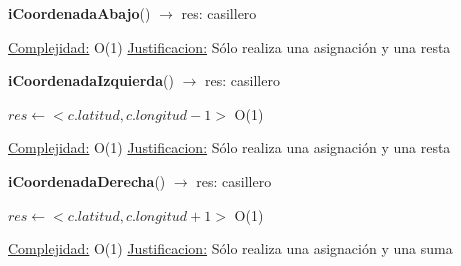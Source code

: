 \begin{Algoritmos}
\begin{algorithm}[H]{\textbf{iCoordenadaAbajo}() $\to$ res: casillero}
\begin{algorithmic}[1]
		\medskip
		\Statex \underline{Complejidad:} O(1)
			\Statex \underline{Justificacion:} Sólo realiza una asignación y una resta
	\end{algorithmic}
\end{algorithm}

\begin{algorithm}[H]{\textbf{iCoordenadaIzquierda}() $\to$ res: casillero}
	\begin{algorithmic}[1]
		\State $res \gets <c.latitud, c.longitud - 1>$ \Comment O(1)
		
		\medskip
		\Statex \underline{Complejidad:} O(1)
			\Statex \underline{Justificacion:} Sólo realiza una asignación y una resta
	\end{algorithmic}
\end{algorithm}


\begin{algorithm}[H]{\textbf{iCoordenadaDerecha}() $\to$ res: casillero}
	\begin{algorithmic}[1]
		\State $res \gets <c.latitud, c.longitud + 1>$ \Comment O(1)
		
		\medskip
		\Statex \underline{Complejidad:} O(1)
			\Statex \underline{Justificacion:} Sólo realiza una asignación y una suma
	\end{algorithmic}
\end{algorithm}

\end{Algoritmos}